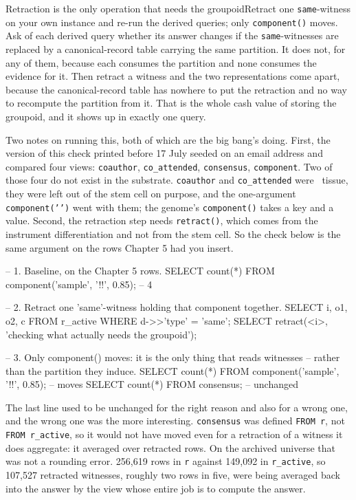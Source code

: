 \begin{Correspondence}{Retraction is the only operation that needs the groupoid}{Retract one \texttt{same}-witness on your own instance and re-run the derived queries; only \texttt{component()} moves.}
Ask of each derived query whether its answer changes if the \texttt{same}-witnesses are replaced by a canonical-record table carrying the same partition. It does not, for any of them, because each consumes the partition and none consumes the evidence for it. Then retract a witness and the two representations come apart, because the canonical-record table has nowhere to put the retraction and no way to recompute the partition from it. That is the whole cash value of storing the groupoid, and it shows up in exactly one query.

Two notes on running this, both of which are the big bang's doing. First, the version of this check printed before 17 July seeded on an email address and compared four views: \texttt{coauthor}, \texttt{co\_attended}, \texttt{consensus}, \texttt{component}. Two of those four do not exist in the substrate. \texttt{coauthor} and \texttt{co\_attended} were \labInstance\ tissue, they were left out of the stem cell on purpose, and the one-argument \texttt{component('\labEmail')} went with them; the genome's \texttt{component()} takes a key and a value. Second, the retraction step needs \texttt{retract()}, which comes from the instrument differentiation and not from the stem cell. So the check below is the same argument on the rows Chapter 5 had you insert.

\begin{Check}
-- 1. Baseline, on the Chapter 5 rows.
SELECT count(*) FROM component('sample', '!\labSample!', 0.85);   -- 4

-- 2. Retract one 'same'-witness holding that component together.
SELECT i, o1, o2, c FROM r_active WHERE d->>'type' = 'same';
SELECT retract(<i>, 'checking what actually needs the groupoid');

-- 3. Only component() moves: it is the only thing that reads witnesses
--    rather than the partition they induce.
SELECT count(*) FROM component('sample', '!\labSample!', 0.85);   -- moves
SELECT count(*) FROM consensus;                                    -- unchanged
\end{Check}

The last line used to be unchanged for the right reason and also for a wrong one, and the wrong one was the more interesting. \texttt{consensus} was defined \texttt{FROM r}, not \texttt{FROM r\_active}, so it would not have moved even for a retraction of a witness it does aggregate: it averaged over retracted rows. On the archived universe that was not a rounding error. 256,619 rows in \texttt{r} against 149,092 in \texttt{r\_active}, so 107,527 retracted witnesses, roughly two rows in five, were being averaged back into the answer by the view whose entire job is to compute the answer.


\end{Correspondence}
